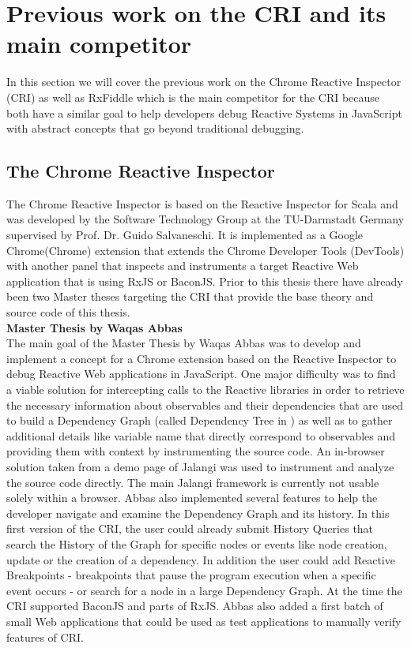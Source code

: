 \section{Previous work on the CRI and its main competitor}
In this section we will cover the previous work on the Chrome Reactive Inspector (CRI) as well as RxFiddle which is the main competitor for the CRI because both have a similar goal to help developers debug Reactive Systems in JavaScript with abstract concepts that go beyond traditional debugging.

	\subsection{The Chrome Reactive Inspector}
	\label{sec:PreviousCRI}
	The Chrome Reactive Inspector is based on the Reactive Inspector for Scala \cite{ReactiveInspector} and was developed by the Software Technology Group at the TU-Darmstadt Germany supervised by Prof. Dr. Guido Salvaneschi. It is implemented as a Google Chrome(Chrome) extension that extends the Chrome Developer Tools (DevTools) with another panel that inspects and instruments a target Reactive Web application that is using RxJS or BaconJS. Prior to this thesis there have already been two Master theses targeting the CRI that provide the base theory and source code of this thesis.\\
	
	\textbf{Master Thesis by Waqas Abbas}\\
	
	\cite{ThesisAbbas} The main goal of the Master Thesis by Waqas Abbas was to develop and implement a concept for a Chrome extension based on the Reactive Inspector to debug Reactive Web applications in JavaScript. One major difficulty was to find a viable solution for intercepting calls to the Reactive libraries in order to retrieve the necessary information about observables and their dependencies that are used to build a Dependency Graph (called Dependency Tree in \cite{ReactiveInspector}) as well as to gather additional details like variable name that directly correspond to observables and providing them with context by instrumenting the source code. An in-browser solution taken from a demo page \cite{JalangiDemo} of Jalangi was used to instrument and analyze the source code directly. The main Jalangi framework \cite{Jalangi} is currently not usable solely within a browser.
	Abbas also implemented several features to help the developer navigate and examine the Dependency Graph and its history. In this first version of the CRI, the user could already submit History Queries that search the History of the Graph for specific nodes or events like node creation, update or the creation of a dependency. In addition the user could add Reactive Breakpoints - breakpoints that pause the program execution when a specific event occurs - or search for a node in a large Dependency Graph.
	At the time the CRI supported BaconJS\cite{BaconJS} and parts of RxJS\cite{RxJS}. Abbas also added a first batch of small Web applications that could be used as test applications to manually verify features of CRI.\\		
		
